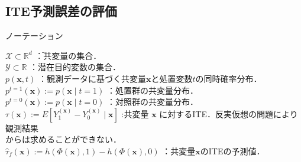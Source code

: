\documentclass[dvipdfmx]{jreport}
\begin{document}
\subsection{ITE予測誤差の評価}
\begin{itembox}[l]{\large{ノーテーション}}
    \begin{tabbing}
        \hspace{15pt} \raisebox{0.5ex}{\tiny $\bullet$} $ \mathcal X \subset \mathbb R^d$ \hspace{105pt}\=：共変量の集合．\\[0.5em]
        \hspace{15pt} \raisebox{0.5ex}{\tiny $\bullet$} $\mathcal Y \subset \mathbb R$ \>：潜在目的変数の集合．\\[0.5em]
        \hspace{15pt} \raisebox{0.5ex}{\tiny $\bullet$} $p(\boldsymbol{x}, t)$ \>：観測データに基づく共変量$\boldsymbol{x}$と処置変数$t$の同時確率分布．\\[0.5em]
        \hspace{15pt} \raisebox{0.5ex}{\tiny $\bullet$} $p^{t=1}(\boldsymbol{x}) := p(\boldsymbol{x} \mid t = 1)$ \>：処置群の共変量分布．\\[0.5em]
        \hspace{15pt} \raisebox{0.5ex}{\tiny $\bullet$} $p^{t=0}(\boldsymbol{x}) := p(\boldsymbol{x} \mid t = 0)$ \>：対照群の共変量分布．\\[0.5em]
        \hspace{15pt} \raisebox{0.5ex}{\tiny $\bullet$} $\tau(\boldsymbol{x}) := E[Y_1^{(\boldsymbol{x})} - Y_0^{(\boldsymbol{x})} \mid \boldsymbol{x}]$ \>:共変量 $\boldsymbol{x}$ に対するITE．反実仮想の問題により観測結果\\[0.5em]\>\hspace{6.5pt}からは求めることができない．\\[0.5em]
        \hspace{15pt} \raisebox{0.5ex}{\tiny $\bullet$} $\hat{\tau}_f(\boldsymbol{x}) := h(\Phi(\boldsymbol{x}), 1) - h(\Phi(\boldsymbol{x}), 0)$ \>：共変量$\boldsymbol{x}$のITEの予測値． \\[0.5em]        

\end{tabbing}
\end{itembox}
\end{document}
